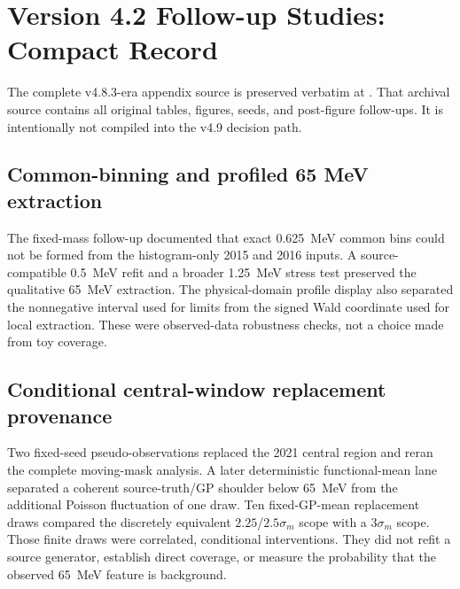 \section{Version 4.2 Follow-up Studies: Compact Record}
\label{app:v4p2-followups}

\begin{center}
\end{center}

The complete v4.8.3-era appendix source is preserved verbatim at
.  That archival source contains
all original tables, figures, seeds, and post-figure follow-ups.  It is intentionally
not compiled into the v4.9 decision path.

\subsection{Common-binning and profiled 65 MeV extraction}
\label{app:v4p2-common-binning}

The fixed-mass follow-up documented that exact 0.625~MeV common bins could not be
formed from the histogram-only 2015 and 2016 inputs.  A source-compatible 0.5~MeV
refit and a broader 1.25~MeV stress test preserved the qualitative 65~MeV extraction.
The physical-domain profile display also separated the nonnegative interval used for
limits from the signed Wald coordinate used for local extraction.  These were
observed-data robustness checks, not a choice made from toy coverage.

\subsection{Conditional central-window replacement provenance}
\label{app:v4p2-pseudo65}

Two fixed-seed pseudo-observations replaced the 2021 central region and reran the
complete moving-mask analysis.  A later deterministic functional-mean lane separated
a coherent source-truth/GP shoulder below 65~MeV from the additional Poisson
fluctuation of one draw.  Ten fixed-GP-mean replacement draws compared the discretely
equivalent $2.25$/$2.5\sigma_m$ scope with a $3\sigma_m$ scope.  Those finite draws
were correlated, conditional interventions.  They did not refit a source generator,
establish direct \CLs{} coverage, or measure the probability that the observed
65~MeV feature is background.

